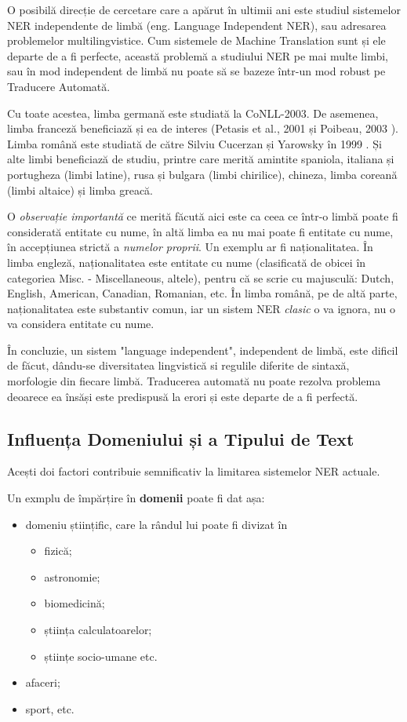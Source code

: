 O posibilă direcție de cercetare care a apărut în ultimii ani este studiul sistemelor NER independente de limbă (eng. Language Independent NER), sau adresarea problemelor multilingvistice. Cum sistemele de Machine Translation  sunt și ele departe de a fi perfecte, această problemă a studiului NER pe mai multe limbi, sau în mod independent de limbă nu poate să se bazeze într-un mod robust pe Traducere Automată.

Cu toate acestea, limba germană este studiată la CoNLL-2003\cite{conll2003}. De asemenea, limba franceză beneficiază și ea de interes (Petasis et al., 2001 \cite{Petasis01usingmachine} și Poibeau, 2003 \cite{And03themultilingual}). Limba română este studiată de către Silviu Cucerzan și Yarowsky în 1999 \cite{Cucerzan99languageindependent}. Și alte limbi beneficiază de studiu, printre care merită amintite spaniola, italiana și portugheza (limbi latine), rusa și bulgara (limbi chirilice), chineza, limba coreană (limbi altaice) și limba greacă.

O \textit{observație importantă} ce merită făcută aici este ca ceea ce într-o limbă poate fi considerată entitate cu nume, în altă limba ea nu mai poate fi entitate cu nume, în accepțiunea strictă a \textit{numelor proprii}. Un exemplu ar fi naționalitatea. În limba engleză, naționalitatea este entitate cu nume (clasificată de obicei în categoriea Misc. - Miscellaneous, altele), pentru că se scrie cu majusculă: Dutch, English, American, Canadian, Romanian, etc. În limba română, pe de altă parte, naționalitatea este substantiv comun, iar un sistem NER \textit{clasic} o va ignora, nu o va considera entitate cu nume.

În concluzie, un sistem "language independent", independent de limbă, este dificil de făcut, dându-se diversitatea lingvistică si regulile diferite de sintaxă, morfologie din fiecare limbă. Traducerea automată nu poate rezolva problema deoarece ea însăși este predispusă la erori și este departe de a fi perfectă.


\subsection{Influența Domeniului și a Tipului de Text}

Acești doi factori contribuie semnificativ la limitarea sistemelor NER actuale. 

Un exmplu de împărțire în \textbf{domenii} poate fi dat așa:
\begin{itemize}
	\item domeniu științific, care la rândul lui poate fi divizat în
	\begin{itemize}
		\item fizică;
		\item astronomie;
		\item biomedicină;
		\item știința calculatoarelor;
		\item științe socio-umane etc.
		
	\end{itemize}
	\item afaceri;
	\item sport, etc.	
\end{itemize}

